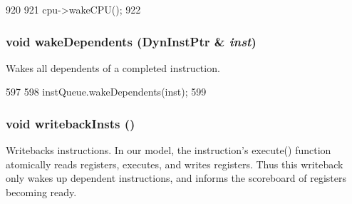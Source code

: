 \begin{DoxyCode}
920 {
921     cpu->wakeCPU();
922 }
\end{DoxyCode}
\hypertarget{classDefaultIEW_a84834d31005dcede47e334bfee5b52d3}{
\subsubsection[{wakeDependents}]{\setlength{\rightskip}{0pt plus 5cm}void wakeDependents ({\bf DynInstPtr} \& {\em inst})}}
\label{classDefaultIEW_a84834d31005dcede47e334bfee5b52d3}
Wakes all dependents of a completed instruction. 


\begin{DoxyCode}
597 {
598     instQueue.wakeDependents(inst);
599 }
\end{DoxyCode}
\hypertarget{classDefaultIEW_a5e9a203f943b3a8a243ddc6d2a0a240d}{
\subsubsection[{writebackInsts}]{\setlength{\rightskip}{0pt plus 5cm}void writebackInsts ()}}
\label{classDefaultIEW_a5e9a203f943b3a8a243ddc6d2a0a240d}
Writebacks instructions. In our model, the instruction's execute() function atomically reads registers, executes, and writes registers. Thus this writeback only wakes up dependent instructions, and informs the scoreboard of registers becoming ready. 


